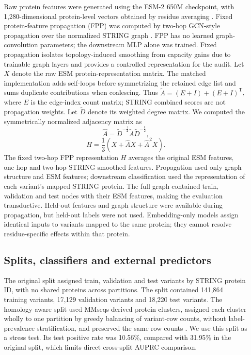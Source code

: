 \documentclass[conference]{IEEEtran}
\begin{document}
Raw protein features were generated using the ESM-2 650M checkpoint, with 1,280-dimensional protein-level vectors obtained by residue averaging \cite{Lin2023ESM}. Fixed protein-feature propagation (FPP) was computed by two-hop GCN-style propagation over the normalized STRING graph \cite{Kipf2017GCN}. FPP has no learned graph-convolution parameters; the downstream MLP alone was trained. Fixed propagation isolates topology-induced smoothing from capacity gains due to trainable graph layers and provides a controlled representation for the audit. Let $X$ denote the raw ESM protein-representation matrix. The matched implementation adds self-loops before symmetrizing the retained edge list and sums duplicate contributions when coalescing. Thus $\tilde{A}=(E+I)+(E+I)^{\mathrm{T}}$, where $E$ is the edge-index count matrix; STRING combined scores are not propagation weights. Let $\tilde{D}$ denote its weighted degree matrix. We computed the symmetrically normalized adjacency matrix as
\begin{equation}
\hat{A}=\tilde{D}^{-\frac{1}{2}}\tilde{A}\tilde{D}^{-\frac{1}{2}},
\end{equation}
\begin{equation}
H=\frac{1}{3}\left(X+\hat{A}X+\hat{A}^{2}X\right).
\end{equation}
The fixed two-hop FPP representation $H$ averages the original ESM features, one-hop and two-hop STRING-smoothed features. Propagation used only graph structure and ESM features; downstream classification used the representation of each variant's mapped STRING protein. The full graph contained train, validation and test nodes with their ESM features, making the evaluation transductive. Held-out features and graph structure were available during propagation, but held-out labels were not used. Embedding-only models assign identical inputs to variants mapped to the same protein; they cannot resolve residue-specific effects within that protein.

\subsection{Splits, classifiers and external predictors}

The original split assigned train, validation and test variants by STRING protein ID, with no shared proteins across partitions. The split contained 141,864 training variants, 17,129 validation variants and 18,220 test variants. The homology-aware split used MMseqs-derived protein clusters, assigned each cluster wholly to one partition by greedy balancing of variant-row counts, without label-prevalence stratification, and preserved the same row counts \cite{Steinegger2017MMseqs2}. We use this split as a stress test. Its test positive rate was 10.56\%, compared with 31.95\% in the original split, which limits direct cross-split AUPRC comparison.
\end{document}
